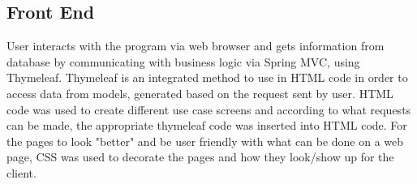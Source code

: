 \subsection{Front End}\label{sub:frontend}
User interacts with the program via web browser and gets information from database by communicating with business logic via Spring MVC, using Thymeleaf. Thymeleaf is an integrated method to use in HTML code in order to access data from models, generated based on the request sent by user. HTML code was used to create different use case screens and according to what requests can be made, the appropriate thymeleaf code was inserted into HTML code. For the pages to look "better" and be user friendly with what can be done on a web page, CSS was used to decorate the pages and how they look/show up for the client.